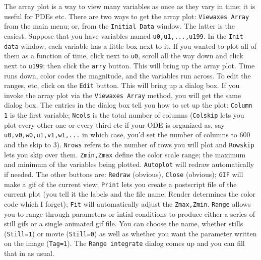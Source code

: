 \documentclass{article}
\begin{document}
The array plot is a way to view many variables as once as they vary in time; it is useful for PDEs etc.  There are two ways to get the array plot: {\tt Viewaxes  Array} from the main menu; or, from the {\tt Initial Data} window. The latter is the easiest. Suppose that you have variables named {\tt u0,u1,...,u199}. In the {\tt Init data} window, each variable has a little box next to it. If you  wanted to plot all of them as a function of time, click next to {\tt u0}, scroll all the way down and click next to {\tt u199}; then click the {\tt arry} button. This will bring up the array plot. Time runs down, color codes the magnitude, and the variables run across.  To edit the ranges, etc, click on the {\tt Edit} button.  This will bring up a dialog box. If you invoke the array plot via the {\tt Viewaxes Array} method, you will get the same dialog box. The entries in the dialog box tell you how to set up the plot: {\tt Column 1} is the first variable; {\tt Ncols} is the total number of columns ({\tt Colskip} lets you plot every other one or every third etc if your ODE is organized as, say {\tt u0,v0,w0,u1,v1,w1,...} in which case, you'd set the number of columns to 600 and the skip to 3).  {\tt Nrows} refers to the number of rows you will plot and {\tt Rowskip} lets you skip over them. {\tt Zmin,Zmax} define the color scale range; the maximum and minimum of the variables being plotted. {\tt Autoplot} will redraw automatically if needed. The other buttons are: {\tt Redraw} (obvious), {\tt Close} (obvious); {\tt GIF} will make a gif of the current view; {\tt Print} lets you create a postscript file of the current plot (you tell it the labels and the file name; Render determines the color code which I forget); {\tt Fit} will automatically adjust the {\tt Zmax,Zmin}. {\tt Range} allows you to range through parameters or intial conditions to produce  either a series of still gifs or a single animated gif file. You can choose the name, whether stills ({\tt Still=1}) or movie ({\tt Still=0}) as well as whether you want the parameter written on the image ({\tt Tag=1}). The {\tt Range integrate} dialog comes up and you can fill that in as usual.  
  
\end{document}
